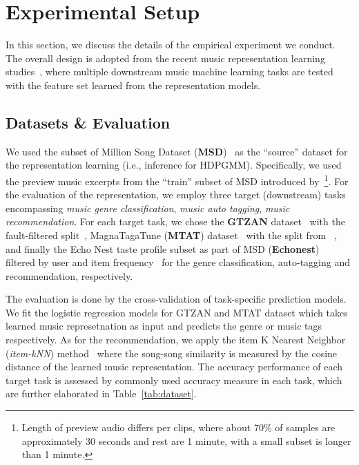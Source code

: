 \documentclass{article}
\begin{document}
\section{Experimental Setup}\label{sec:experimental_setup}

In this section, we discuss the details of the empirical experiment we conduct. The overall design is adopted from the recent music representation learning studies~\cite{DBLP:conf/ismir/ChoiFSC17,DBLP:journals/nca/KimULH20,DBLP:conf/ismir/SpijkervetB21}, where multiple downstream music machine learning tasks are tested with the feature set learned from the representation models.

\subsection{Datasets \& Evaluation}\label{sec:experimental_setup:datasets_evaluation}

We used the subset of Million Song Dataset (\textbf{MSD})~\cite{Bertin-Mahieux2011} as the ``source'' dataset for the representation learning (i.e., inference for HDPGMM). Specifically, we used the preview music excerpts from the ``train'' subset of MSD introduced by~\cite{DBLP:conf/ismir/PonsNPSES18,app8010150}\footnote{Length of preview audio differs per clips, where about 70\% of samples are approximately 30 seconds and rest are 1 minute, with a small subset is longer than 1 minute.}.
For the evaluation of the representation, we employ three target (downstream) tasks encompassing \emph{music genre classification}, \emph{music auto tagging}, \emph{music recommendation}. For each target task, we chose the \textbf{GTZAN} dataset~\cite{DBLP:journals/taslp/TzanetakisC02} with the fault-filtered split~\cite{DBLP:journals/tmm/KereliukSL15}, MagnaTagaTune (\textbf{MTAT}) dataset~\cite{DBLP:conf/ismir/LawWMBD09} with the split from ~\cite{lee_multi-level_2017}, and finally the Echo Nest taste profile subset as part of MSD (\textbf{Echonest})~\cite{Bertin-Mahieux2011} filtered by user and item frequency~\cite{DBLP:conf/www/LiangKHJ18} for the genre classification, auto-tagging and recommendation, respectively.

The evaluation is done by the cross-validation of task-specific prediction models. We fit the logistic regression models for GTZAN and MTAT dataset which takes learned music represetnation as input and predicts the genre or music tags respectively. As for the recommendation, we apply the item K Nearest Neighbor (\emph{item-kNN}) method~\cite{DBLP:journals/tois/DeshpandeK04} where the song-song similarity is measured by the cosine distance of the learned music representation. The accuracy performance of each target task is assessed by commonly used accuracy measure in each task, which are further elaborated in Table~\ref{tab:dataset}.
\end{document}
